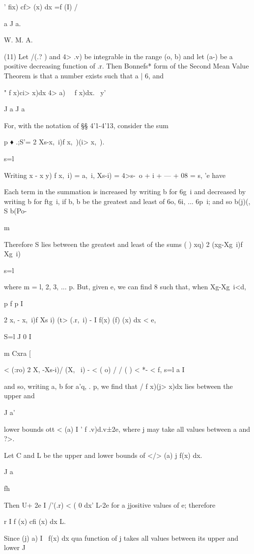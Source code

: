 ' fix) cf> (x) dx =f (I) / %

a J a.

W. M. A.

%
%

(11) Let /(.? ) and 4> .v) be integrable in the range (o, b) and let
(a-) be a positive decreasing function of .r. Then Bonnefs* form of
the Second Mean Value Theorem is that a number exists such that a | 6,
and

 " f x)ci> x)dx 4> a) \ \ f x)dx. \ y'

J a J a

For, with the notation of §§ 4'1-4'13, consider the sum

p ♦ .;S'= 2 Xs-x,\ i)f x,\ )(i> x,\ ).

s=l

Writing x - x y) f x,\ i) = a,\ i, Xs-i) = 4>s-\, o + i + --- + 08 =
s, 'e have

Each term in the summation is increased by writing b for 6g\ i and
decreased by writing b for ftg\ i, if b, b be the greatest and least
of 6o, 6i, ... 6p\ i; and so b(j)(, S b(Po-

m

Therefore S lies between the greatest and least of the sums ( ) xq) 2
(xg-Xg\ i)f Xg\ i)

s=l

where m = l, 2, 3, ... p. But, given e, we can find 8 such that, when
Xg-Xg\ i<d,

p f p I

2 x, - x,\ i)f Xs i) (t> (.r,\ i) - I f(x) (f) (x) dx < e,

S=l J 0 I

m Cxra [

< (:ro) 2 X, -Xs-i)/ (X, \ i) - < ( o) / / ( ) < *- < f, s=l a I

and so, writing a, b for a'q, . p, we find that / f x)(j> x)dx lies
between the upper and

J a'

lower bounds ott < (a) I ' f .v)d.v±2e, where j may take all values
between a and ?>.

Let C and L be the upper and lower bounds of </> (a) j f(x) dx.

J a

fh

Then U+ 2e I /'(.r) < ( 0 dx' L-2e for a jjositive values of e;
therefore

r I f (x) cfi (x) dx L.

Since (j) a) I \ f(x) dx qua function of j takes all values between
its upper and lower J

